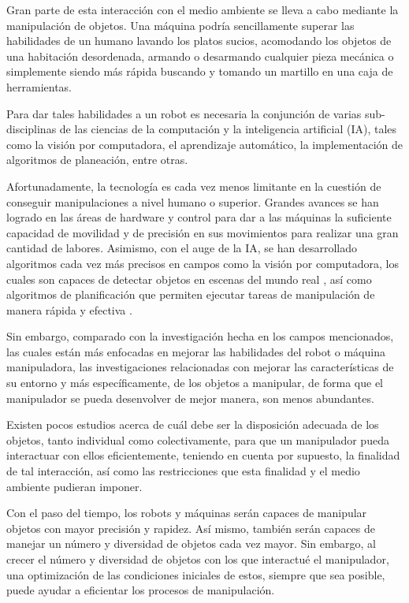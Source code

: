 Gran parte de esta interacción con el medio ambiente se lleva a cabo mediante la manipulación de objetos.
Una máquina podría sencillamente superar las habilidades de un humano lavando los platos sucios, acomodando los objetos de una habitación desordenada, armando o desarmando cualquier pieza mecánica o simplemente siendo más rápida buscando y tomando un martillo en una caja de herramientas.

Para dar tales habilidades a un robot es necesaria la conjunción de varias sub-disciplinas de las ciencias de la computación y la inteligencia artificial (IA), tales como la visión por computadora, el aprendizaje automático, la implementación de algoritmos de planeación, entre otras.

Afortunadamente, la tecnología es cada vez menos limitante en la cuestión de conseguir manipulaciones a nivel humano o superior.
Grandes avances se han logrado en las áreas de hardware y control para dar a las máquinas la suficiente capacidad de movilidad y de precisión en sus movimientos para realizar una gran cantidad de labores.
Asimismo, con el auge de la IA, se han desarrollado algoritmos cada vez más precisos en campos como la visión por computadora, los cuales son capaces de detectar objetos en escenas del mundo real \cite{Georgakis-RSS-17}, así como algoritmos de planificación que permiten ejecutar tareas de manipulación de manera rápida y efectiva \cite{10160887}.

Sin embargo, comparado con la investigación hecha en los campos mencionados, las cuales están más enfocadas en mejorar las habilidades del robot o máquina manipuladora, las investigaciones relacionadas con mejorar las características de su entorno y más específicamente, de los objetos a manipular, de forma que el manipulador se pueda desenvolver de mejor manera, son menos abundantes.

Existen pocos estudios acerca de cuál debe ser la disposición adecuada de los objetos, tanto individual como colectivamente, para que un manipulador pueda interactuar con ellos eficientemente, teniendo en cuenta por supuesto, la finalidad de tal interacción, así como las restricciones que esta finalidad y el medio ambiente pudieran imponer.

Con el paso del tiempo, los robots y máquinas serán capaces de manipular objetos con mayor precisión y rapidez.
Así mismo, también serán capaces de manejar un número y diversidad de objetos cada vez mayor. 
Sin embargo, al crecer el número y diversidad de objetos con los que interactué el manipulador, una optimización de las condiciones iniciales de estos, siempre que sea posible, puede ayudar a eficientar los procesos de manipulación.

